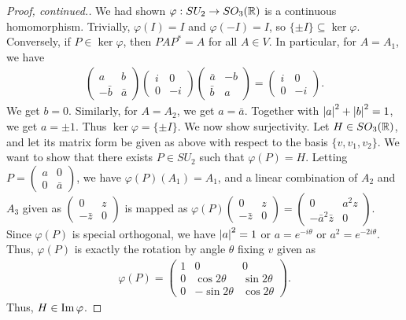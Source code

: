 \begin{proof}[Proof, continued.]
    We had shown $\varphi: SU_{2} \to SO_{3}(\mathbb{R})$ is a continuous homomorphism. Trivially, $\varphi(I) = I$ and $\varphi(-I) = I$, so $\{\pm I\} \subseteq \ker \varphi$. Conversely, if $P \in \ker \varphi$, then $PAP^{\ast} = A$ for all $A \in V$. In particular, for $A = A_{1}$, we have
    \begin{align}
        \begin{pmatrix}
            a & b \\ -\bar{b} & \bar{a}
        \end{pmatrix} \begin{pmatrix}
            i & 0 \\ 0 & -i
        \end{pmatrix} \begin{pmatrix}
            \bar{a} & -b \\ \bar{b} & a
        \end{pmatrix} = \begin{pmatrix}
            i & 0 \\ 0 & -i
        \end{pmatrix}.
    \end{align}
    We get $b = 0$. Similarly, for $A = A_{2}$, we get $a = \bar{a}$. Together with $\left| a \right|^{2} + \left| b \right|^{2} = 1$, we get $a = \pm 1$. Thus $\ker \varphi = \{\pm I\}$. We now show surjectivity. Let $H \in SO_{3}(\mathbb{R})$, and let its matrix form be given as above with respect to the basis $\{v,v_{1},v_{2}\}$. We want to show that there exists $P \in SU_{2}$ such that $\varphi(P) = H$. Letting $P = \begin{pmatrix}
        a & 0 \\ 0 & \bar{a}
    \end{pmatrix}$, we have $\varphi(P)(A_{1}) = A_{1}$, and a linear combination of $A_{2}$ and $A_{3}$ given as $\begin{pmatrix}
        0 & z \\ -\bar{z} & 0
    \end{pmatrix}$ is mapped as $\varphi(P) \begin{pmatrix}
        0 & z \\ -\bar{z} & 0
    \end{pmatrix} = \begin{pmatrix}
        0 & a^{2} z \\ -\bar{a}^{2} \bar{z} & 0
    \end{pmatrix}$. Since $\varphi(P)$ is special orthogonal, we have $\left| a \right|^{2} = 1$ or $a = e^{-i\theta}$ or $a^{2} = e^{-2i\theta}$. Thus, $\varphi(P)$ is exactly the rotation by angle $\theta$ fixing $v$ given as
    \begin{align}
        \varphi(P) = \begin{pmatrix}
            1 & 0 & 0 \\ 0 & \cos 2\theta & \sin 2\theta \\ 0 & -\sin 2\theta & \cos 2\theta
        \end{pmatrix}.
    \end{align}
    Thus, $H \in \operatorname{Im} \varphi$.
\end{proof}